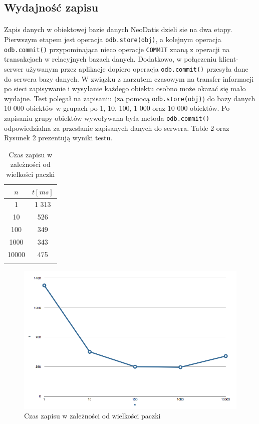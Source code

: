 \documentclass[wide,a4paper,titlepage,12pt] {article}
\begin{document}
  \newpage
  \subsection{Wydajność zapisu}
  \paragraph{}
  Zapis danych w obiektowej bazie danych NeoDatis dzieli sie na dwa etapy. Pierwszym etapem jest operacja \texttt{odb.store(obj)}, a kolejnym operacja \texttt{odb.commit()} przypominająca nieco operacje \texttt{COMMIT} znaną z operacji na transakcjach w relacyjnych bazach danych. Dodatkowo, w połączeniu klient-serwer używanym przez aplikacje dopiero operacja \texttt{odb.commit()} przesyła dane do serwera bazy danych. W związku z narzutem czasowym na transfer informacji po sieci zapisywanie i wysyłanie każdego obiektu osobno może okazać się mało wydajne.
Test polegał na zapisaniu (za pomocą \texttt{odb.store(obj)}) do bazy danych 10 000 obiektów w grupach po 1, 10, 100, 1 000 oraz 10 000 obiektów. Po zapisaniu grupy obiektów wywoływana była metoda \texttt{odb.commit()} odpowiedzialna za przesłanie zapisanych danych do serwera. Table 2 oraz Rysunek 2 prezentują wyniki testu.

  \begin{longtable}{|c|c|}
    \hline
    $n$ &	$t [ms]$ \\
    \hline
    1 & 1 313 \\
    10   & 526 \\
    100  & 349 \\
    1000 & 343 \\
    10000 &	475 \\
    \hline
    \caption{Czas zapisu w zależności od wielkości paczki}
  \end{longtable}


  \begin{figure}[H]
    \begin{center}
      \includegraphics[width=\textwidth]{2.png}
      \caption{Czas zapisu w zależności od wielkości paczki}
    \end{center}
  \end{figure}
\end{document}
